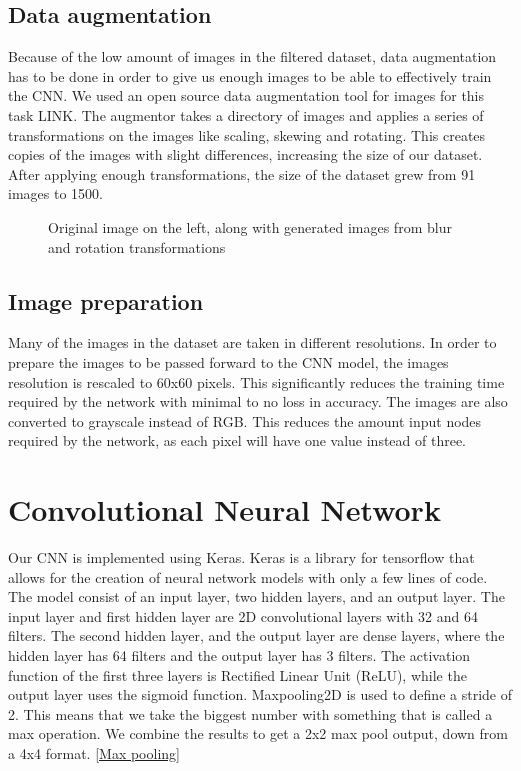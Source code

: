 \subsection{Data augmentation}\label{data augmentation}
Because of the low amount of images in the filtered dataset, data augmentation has to be done in order to give us enough images to be able to effectively train the CNN.
We used an open source data augmentation tool for images for this task LINK.
The augmentor takes a directory of images and applies a series of transformations on the images like scaling, skewing and rotating.
This creates copies of the images with slight differences, increasing the size of our dataset.
After applying enough transformations, the size of the dataset grew from 91 images to 1500.

\begin{figure}[h]
    \caption{Original image on the left, along with generated images from blur and rotation transformations}
    \label{fig:figure4.3}
\end{figure}

\subsection{Image preparation}\label{imgprep}
Many of the images in the dataset are taken in different resolutions.
In order to prepare the images to be passed forward to the CNN model, the images resolution is rescaled to 60x60 pixels.
This significantly reduces the training time required by the network with minimal to no loss in accuracy.
The images are also converted to grayscale instead of RGB.
This reduces the amount input nodes required by the network, as each pixel will have one value instead of three.

\section{Convolutional Neural Network}\label{sec:cnn}

Our CNN is implemented using Keras.
Keras is a library for tensorflow that allows for the creation of neural network models with only a few lines of code.
The model consist of an input layer, two hidden layers, and an output layer.
The input layer and first hidden layer are 2D convolutional layers with 32 and 64 filters.
The second hidden layer, and the output layer are dense layers, where the hidden layer has 64 filters and the output layer has 3 filters.
The activation function of the first three layers is Rectified Linear Unit (ReLU), while the output layer uses the sigmoid function.
Maxpooling2D is used to define a stride of 2.
This means that we take the biggest number with something that is called a max operation.
We combine the results to get a 2x2 max pool output, down from a 4x4 format.
\ref{Max pooling}

